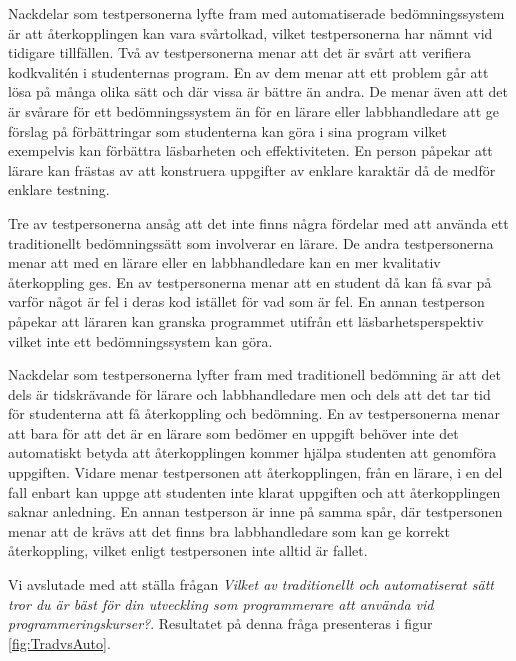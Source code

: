 \documentclass[a4paper,11pt]{article}
\begin{document}
{Nackdelar som testpersonerna lyfte fram med automatiserade bedömningssystem är att återkopplingen kan vara svårtolkad, vilket testpersonerna har nämnt vid tidigare tillfällen. Två av testpersonerna menar att det är svårt att verifiera kodkvalitén i studenternas program. En av dem menar att ett problem går att lösa på många olika sätt och där vissa är bättre än andra. De menar även att det är svårare för ett bedömningssystem än för en lärare eller labbhandledare att ge förslag på förbättringar som studenterna kan göra i sina program vilket exempelvis kan förbättra läsbarheten och effektiviteten. En person påpekar att lärare kan frästas av att konstruera uppgifter av enklare karaktär då de medför enklare testning.

Tre av testpersonerna ansåg att det inte finns några fördelar med att använda ett traditionellt bedömningssätt som involverar en lärare. De andra testpersonerna menar att med en lärare eller en labbhandledare kan en mer kvalitativ återkoppling ges. En av testpersonerna menar att en student då kan få svar på varför något är fel i deras kod istället för vad som är fel. En annan testperson påpekar att läraren kan granska programmet utifrån ett läsbarhetsperspektiv vilket inte ett bedömningssystem kan göra.

Nackdelar som testpersonerna lyfter fram med traditionell bedömning är att det dels är tidskrävande för lärare och labbhandledare men och dels att det tar tid för studenterna att få återkoppling och bedömning. En av testpersonerna menar att bara för att det är en lärare som bedömer en uppgift behöver inte det automatiskt betyda att återkopplingen kommer hjälpa studenten att genomföra uppgiften. Vidare menar testpersonen att återkopplingen, från en lärare, i en del fall enbart kan uppge att studenten inte klarat uppgiften och att återkopplingen saknar anledning. En annan testperson är inne på samma spår, där testpersonen menar att de krävs att det finns bra labbhandledare som kan ge korrekt återkoppling, vilket enligt testpersonen inte alltid är fallet.

Vi avslutade med att ställa frågan \textit{Vilket av traditionellt och automatiserat sätt tror du är bäst för din utveckling som programmerare att använda vid programmeringskurser?}. Resultatet på denna fråga presenteras i figur \ref{fig:TradvsAuto}.

}
\end{document}
